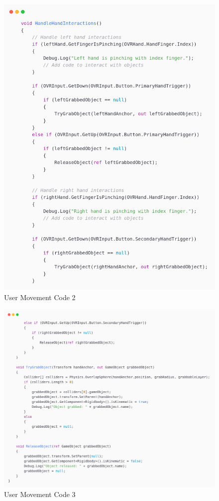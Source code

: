 \begin{figure}[h] 
	\centering
	\includegraphics[width=1\textwidth, height=0.7\textheight]{Images/playerp2.png}
	\caption{User Movement Code 2}
	\label{fig:User Movement Code 2}
\end{figure}
\newpage
\begin{figure}[h] 
	\centering
	\includegraphics[width=1\textwidth, height=0.7\textheight]{Images/playerp3.png}
	\caption{User Movement Code 3}
	\label{fig:User Movement Code 3}
\end{figure}
